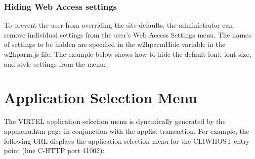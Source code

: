 \documentclass[letterpaper,10pt,english]{sphinxmanual}
\begin{document}
\subsubsection{Hiding Web Access settings}
\label{\detokenize{User_Guide:hiding-web-access-settings}}
To prevent the user from overriding the site defaults, the administrator can remove individual settings from the user’s Web Access Settings menu. The names of settings to be hidden are specified in the w2hparmHide variable in the w2hparm.js file. The example below shows how to hide the default font, font size, and style settings from the menu:

\begin{sphinxVerbatim}[commandchars=\\\{\}]
   
   
   \PYG{p}{[}  \PYG{p}{]}
\end{sphinxVerbatim}



\section{Application Selection Menu}
\label{\detokenize{User_Guide:application-selection-menu}}
The VIRTEL application selection menu is dynamically generated by the appmenu.htm page in conjunction with the applist transaction. For example, the following URL displays the application selection menu for the CLIWHOST entry point (line C-HTTP port 41002):
\end{document}
